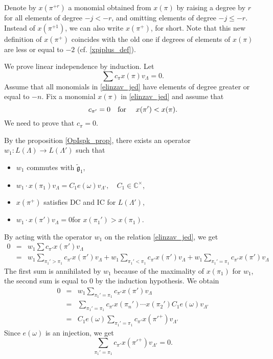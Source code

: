 \documentclass[a4paper, 10pt,oneside]{amsart}
\begin{document}
Denote by $x(\pi^{+r})$ a monomial obtained from $x(\pi)$ by raising a degree by $r$ for all elements of degree $-j<-r$, and
omitting elements of degree $-j\leq -r$. Instead of $x(\pi^{+1})$, we can also write $x(\pi^+)$, for short.
Note that this new definition of $x(\pi^+)$ coincides with the old one
if degrees of elements of $x(\pi)$ are less or equal to $-2$ (cf. \eqref{xpiplus_def}).

We prove linear independence by induction. Let
\begin{equation} \label{elinzav_jed} \sum c_\pi
x(\pi)v_\Lambda=0.\end{equation} Assume that all monomials in \eqref{elinzav_jed} have elements of degree greater or equal to $-n$.
Fix a monomial $x(\pi)$ in \eqref{elinzav_jed} and assume that
$$c_{\pi'}=0 \textrm{\quad for \quad} x(\pi')<x(\pi).$$
We need to prove that $c_\pi=0$.

By the proposition \ref{OpIspk_prop}, there exists an operator $w_1:L(\Lambda)\to L(\Lambda') $ such that
\begin{itemize}
\item $w_1$ commutes with ${\tilde{{\mathfrak g}}}_1$,
\item $w_1\cdot x(\pi_1) v_\Lambda = C_1 e(\omega) v_{\Lambda'},\quad C_1\in{{\mathbb C}}^\times$,
\item $x(\pi^+)$ satisfies DC and IC for $L(\Lambda')$,
\item $w_1\cdot x(\pi')v_\Lambda=0$\quad for \quad $x(\pi_1')>x(\pi_1)$.
\end{itemize}
By acting with the operator $w_1$ on the relation \eqref{elinzav_jed}, we get
\begin{eqnarray*}
0 & = & w_1 \sum c_{\pi'}x(\pi') v_\Lambda\\
 & = & w_1 \sum_{\pi_1'>\pi_1}c_{\pi'}x(\pi') v_\Lambda +w_1 \sum_{\pi_1'<\pi_1}c_{\pi'}x(\pi')
 v_\Lambda+ w_1 \sum_{\pi_1'=\pi_1}c_{\pi'}x(\pi') v_\Lambda
\end{eqnarray*}
The first sum is annihilated by $w_1$ because of the maximality of $x(\pi_1)$ for $w_1$, the second sum is equal to $0$ by the induction hypothesis.
We obtain
\begin{eqnarray*}
0 & = & w_1 \sum_{\pi_1'=\pi_1}c_{\pi'}x(\pi') v_\Lambda\\
  & = & \sum_{\pi_1'=\pi_1}c_{\pi'}x(\pi_n')\cdots x(\pi_2') C_1 e(\omega) v_{\Lambda'}\\
 & = & C_1 e(\omega) \sum_{\pi_1'=\pi_1}c_{\pi'}x(\pi'^+) v_{\Lambda'}
\end{eqnarray*}
Since  $e(\omega)$ is an injection, we get
\begin{equation}
\label{elinzav2_jed} \sum_{\pi_1'=\pi_1}c_{\pi'}x(\pi'^+)
v_{\Lambda'}=0.\end{equation}
\end{document}
